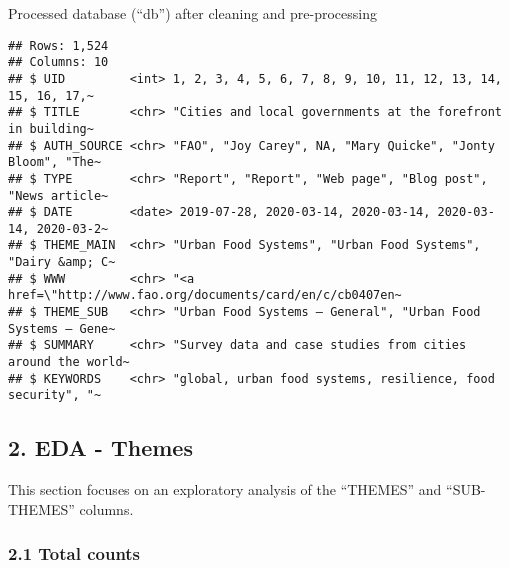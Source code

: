 \documentclass[
]{article}
\begin{document}
Processed database (``db'') after cleaning and pre-processing

\begin{verbatim}
## Rows: 1,524
## Columns: 10
## $ UID         <int> 1, 2, 3, 4, 5, 6, 7, 8, 9, 10, 11, 12, 13, 14, 15, 16, 17,~
## $ TITLE       <chr> "Cities and local governments at the forefront in building~
## $ AUTH_SOURCE <chr> "FAO", "Joy Carey", NA, "Mary Quicke", "Jonty Bloom", "The~
## $ TYPE        <chr> "Report", "Report", "Web page", "Blog post", "News article~
## $ DATE        <date> 2019-07-28, 2020-03-14, 2020-03-14, 2020-03-14, 2020-03-2~
## $ THEME_MAIN  <chr> "Urban Food Systems", "Urban Food Systems", "Dairy &amp; C~
## $ WWW         <chr> "<a href=\"http://www.fao.org/documents/card/en/c/cb0407en~
## $ THEME_SUB   <chr> "Urban Food Systems – General", "Urban Food Systems – Gene~
## $ SUMMARY     <chr> "Survey data and case studies from cities around the world~
## $ KEYWORDS    <chr> "global, urban food systems, resilience, food security", "~
\end{verbatim}

\hypertarget{eda---themes}{%
\subsection{2. EDA - Themes}\label{eda---themes}}

This section focuses on an exploratory analysis of the ``THEMES'' and
``SUB-THEMES'' columns.

\hypertarget{total-counts}{%
\subsubsection{2.1 Total counts}\label{total-counts}}
\end{document}
